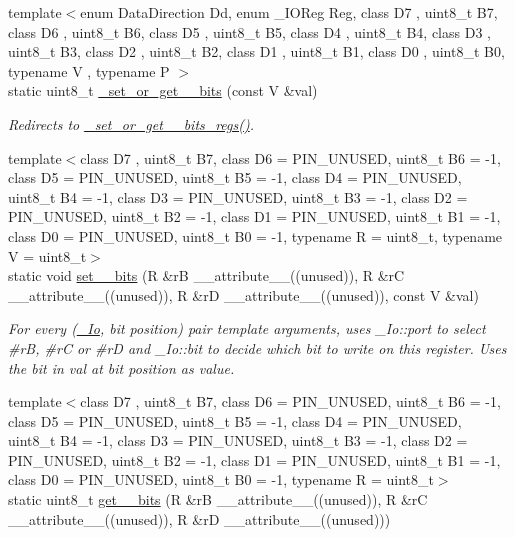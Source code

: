 \begin{DoxyCompactItemize}
{\footnotesize template$<$enum Data\+Direction Dd, enum \+\_\+\+I\+O\+Reg Reg, class D7 , uint8\+\_\+t B7, class D6 , uint8\+\_\+t B6, class D5 , uint8\+\_\+t B5, class D4 , uint8\+\_\+t B4, class D3 , uint8\+\_\+t B3, class D2 , uint8\+\_\+t B2, class D1 , uint8\+\_\+t B1, class D0 , uint8\+\_\+t B0, typename V , typename P $>$ }\\static uint8\+\_\+t \hyperlink{namespaceports_ada41109199590d9ccafae0f6d2adaf99}{\+\_\+set\+\_\+or\+\_\+get\+\_\+\_\+bits} (const V \&val)
\begin{DoxyCompactList}\small\item\em Redirects to \hyperlink{namespaceports_a49c5f4c094bbfe316f3d63897cd7f6a6}{\+\_\+set\+\_\+or\+\_\+get\+\_\+\_\+bits\+\_\+regs()}. \end{DoxyCompactList}\item 
{\footnotesize template$<$class D7 , uint8\+\_\+t B7, class D6  = P\+I\+N\+\_\+\+U\+N\+U\+S\+ED, uint8\+\_\+t B6 = -\/1, class D5  = P\+I\+N\+\_\+\+U\+N\+U\+S\+ED, uint8\+\_\+t B5 = -\/1, class D4  = P\+I\+N\+\_\+\+U\+N\+U\+S\+ED, uint8\+\_\+t B4 = -\/1, class D3  = P\+I\+N\+\_\+\+U\+N\+U\+S\+ED, uint8\+\_\+t B3 = -\/1, class D2  = P\+I\+N\+\_\+\+U\+N\+U\+S\+ED, uint8\+\_\+t B2 = -\/1, class D1  = P\+I\+N\+\_\+\+U\+N\+U\+S\+ED, uint8\+\_\+t B1 = -\/1, class D0  = P\+I\+N\+\_\+\+U\+N\+U\+S\+ED, uint8\+\_\+t B0 = -\/1, typename R  = uint8\+\_\+t, typename V  = uint8\+\_\+t$>$ }\\static void \hyperlink{namespaceports_aad48d351c7d83de929acb9e149663d41}{set\+\_\+\_\+bits} (R \&rB \+\_\+\+\_\+attribute\+\_\+\+\_\+((unused)), R \&rC \+\_\+\+\_\+attribute\+\_\+\+\_\+((unused)), R \&rD \+\_\+\+\_\+attribute\+\_\+\+\_\+((unused)), const V \&val)
\begin{DoxyCompactList}\small\item\em For every (\hyperlink{structports_1_1__Io}{\+\_\+\+Io}, \textquotesingle{}bit position\textquotesingle{}) pair template arguments, uses \+\_\+\+Io\+::port to select \#rB, \#rC or \#rD and \+\_\+\+Io\+::bit to decide which bit to write on this register. Uses the bit in {\ttfamily val} at \textquotesingle{}bit position\textquotesingle{} as value. \end{DoxyCompactList}\item 
{\footnotesize template$<$class D7 , uint8\+\_\+t B7, class D6  = P\+I\+N\+\_\+\+U\+N\+U\+S\+ED, uint8\+\_\+t B6 = -\/1, class D5  = P\+I\+N\+\_\+\+U\+N\+U\+S\+ED, uint8\+\_\+t B5 = -\/1, class D4  = P\+I\+N\+\_\+\+U\+N\+U\+S\+ED, uint8\+\_\+t B4 = -\/1, class D3  = P\+I\+N\+\_\+\+U\+N\+U\+S\+ED, uint8\+\_\+t B3 = -\/1, class D2  = P\+I\+N\+\_\+\+U\+N\+U\+S\+ED, uint8\+\_\+t B2 = -\/1, class D1  = P\+I\+N\+\_\+\+U\+N\+U\+S\+ED, uint8\+\_\+t B1 = -\/1, class D0  = P\+I\+N\+\_\+\+U\+N\+U\+S\+ED, uint8\+\_\+t B0 = -\/1, typename R  = uint8\+\_\+t$>$ }\\static uint8\+\_\+t \hyperlink{namespaceports_aa361d75af5b2f101c6304d1385c023ce}{get\+\_\+\_\+bits} (R \&rB \+\_\+\+\_\+attribute\+\_\+\+\_\+((unused)), R \&rC \+\_\+\+\_\+attribute\+\_\+\+\_\+((unused)), R \&rD \+\_\+\+\_\+attribute\+\_\+\+\_\+((unused)))

\end{DoxyCompactItemize}
